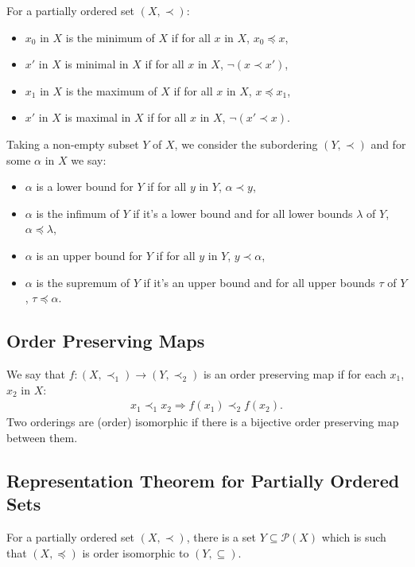 For a partially ordered set $(X, \prec)$: \begin{itemize}
    \item $x_0$ in $X$ is the minimum of $X$ if for all $x$ in $X$,
        $x_0 \preceq x$,
    \item $x'$ in $X$ is minimal in $X$ if for all $x$ in $X$,
        $\neg(x \prec x')$,
    \item $x_1$ in $X$ is the maximum of $X$ if for all $x$ in $X$,
        $x \preceq x_1$,
    \item $x'$ in $X$ is maximal in $X$ if for all $x$ in $X$,
        $\neg(x' \prec x)$.
\end{itemize} Taking a non-empty subset $Y$ of $X$, we consider
the subordering $(Y, \prec)$ and for some $\alpha$ in $X$ we say:
\begin{itemize}
    \item $\alpha$ is a lower bound for $Y$ if for all $y$ in $Y$,
        $\alpha \prec y$,
    \item $\alpha$ is the infimum of $Y$ if it's a lower bound and
        for all lower bounds $\lambda$ of $Y$, $\alpha \preceq \lambda$,
    \item $\alpha$ is an upper bound for $Y$ if for all $y$ in $Y$,
        $y \prec \alpha$,
    \item $\alpha$ is the supremum of $Y$ if it's an upper bound and
        for all upper bounds $\tau$ of $Y$, $\tau \preceq \alpha$.
\end{itemize}

\subsection{Order Preserving Maps}

We say that $f : (X, \prec_1) \to (Y, \prec_2)$ is an order
preserving map if for each $x_1$, $x_2$ in $X$: \begin{align*}
    x_1 \prec_1 x_2 \Longrightarrow f(x_1) \prec_2 f(x_2).
\end{align*} Two orderings are (order) isomorphic if there is
a bijective order preserving map between them.

\subsection{Representation Theorem for Partially Ordered Sets}

For a partially ordered set $(X, \prec)$, there is a set 
$Y \subseteq \mathcal{P}(X)$ which is such that $(X, \preceq)$
is order isomorphic to $(Y, \subseteq)$.

